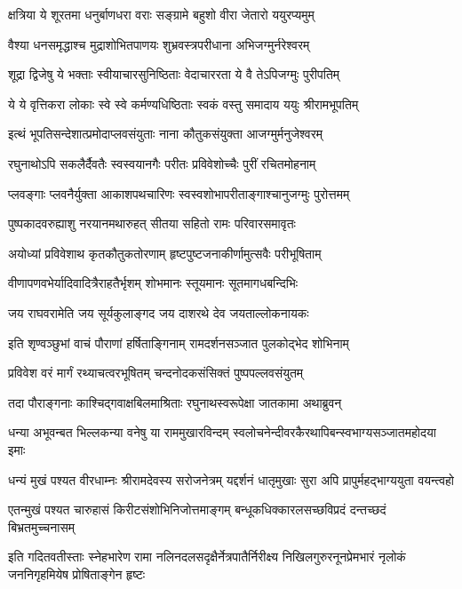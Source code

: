 \twolineshloka
{क्षत्रिया ये शूरतमा धनुर्बाणधरा वराः}
{सङ्ग्रामे बहुशो वीरा जेतारो ययुरप्यमुम्}%

\twolineshloka
{वैश्या धनसमृद्धाश्च मुद्राशोभितपाणयः}
{शुभ्रवस्त्रपरीधाना अभिजग्मुर्नरेश्वरम्}%

\twolineshloka
{शूद्रा द्विजेषु ये भक्ताः स्वीयाचारसुनिष्ठिताः}
{वेदाचाररता ये वै तेऽपिजग्मुः पुरीपतिम्}%

\twolineshloka
{ये ये वृत्तिकरा लोकाः स्वे स्वे कर्मण्यधिष्ठिताः}
{स्वकं वस्तु समादाय ययुः श्रीरामभूपतिम्}%

\twolineshloka
{इत्थं भूपतिसन्देशात्प्रमोदाप्लवसंयुताः}
{नाना कौतुकसंयुक्ता आजग्मुर्मनुजेश्वरम्}%


\twolineshloka
{रघुनाथोऽपि सकलैर्दैवतैः स्वस्वयानगैः}
{परीतः प्रविवेशोच्चैः पुरीं रचितमोहनाम्}%

\twolineshloka
{प्लवङ्गाः प्लवनैर्युक्ता आकाशपथचारिणः}
{स्वस्वशोभापरीताङ्गाश्चानुजग्मुः पुरोत्तमम्}%

\twolineshloka
{पुष्पकादवरुह्याशु नरयानमथारुहत्}
{सीतया सहितो रामः परिवारसमावृतः}%

\twolineshloka
{अयोध्यां प्रविवेशाथ कृतकौतुकतोरणाम्}
{हृष्टपुष्टजनाकीर्णामुत्सवैः परीभूषिताम्}%

\twolineshloka
{वीणापणवभेर्यादिवादित्रैराहतैर्भृशम्}
{शोभमानः स्तूयमानः सूतमागधबन्दिभिः}%

\twolineshloka
{जय राघवरामेति जय सूर्यकुलाङ्गद}
{जय दाशरथे देव जयताल्लोकनायकः}%

\twolineshloka
{इति शृण्वञ्छुभां वाचं पौराणां हर्षिताङ्गिनाम्}
{रामदर्शनसञ्जात पुलकोद्भेद शोभिनाम्}%

\twolineshloka
{प्रविवेश वरं मार्गं रथ्याचत्वरभूषितम्}
{चन्दनोदकसंसिक्तं पुष्पपल्लवसंयुतम्}%

\twolineshloka
{तदा पौराङ्गनाः काश्चिद्गवाक्षबिलमाश्रिताः}
{रघुनाथस्वरूपेक्षा जातकामा अथाब्रुवन्}%


\twolineshloka
{धन्या अभूवन्बत भिल्लकन्या वनेषु या राममुखारविन्दम्}
{स्वलोचनेन्दीवरकैरथापिबन्स्वभाग्यसञ्जातमहोदया इमाः}%

\twolineshloka
{धन्यं मुखं पश्यत वीरधाम्नः श्रीरामदेवस्य सरोजनेत्रम्}
{यद्दर्शनं धातृमुखाः सुरा अपि प्रापुर्महद्भाग्ययुता वयन्त्वहो}%

\twolineshloka
{एतन्मुखं पश्यत चारुहासं किरीटसंशोभिनिजोत्तमाङ्गम्}
{बन्धूकधिक्कारलसच्छविप्रदं दन्तच्छदं बिभ्रतमुच्चनासम्}%

\twolineshloka
{इति गदितवतीस्ताः स्नेहभारेण रामा नलिनदलसदृक्षैर्नेत्रपातैर्निरीक्ष्य}
{निखिलगुरुरनूनप्रेमभारं नृलोकं जननिगृहमियेष प्रोषिताङ्गेन हृष्टः}%

